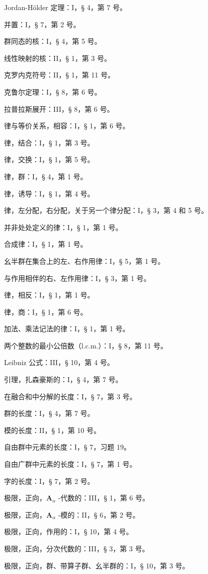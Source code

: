 Jordan-Hölder 定理：I，§ 4，第 7 号。

并置：I，§ 7，第 2 号。

群同态的核：I，§ 4，第 5 号。

线性映射的核：II，§ 1，第 3 号。

克罗内克符号：II，§ 1，第 11 号。

克鲁尔定理：I，§ 8，第 6 号。

拉普拉斯展开：III，§ 8，第 6 号。

律与等价关系，相容：I，§ 1，第 6 号。

律，结合：I，§ 1，第 3 号。

律，交换：I，§ 1，第 5 号。

律，群：I，§ 4，第 1 号。

律，诱导：I，§ 1，第 4 号。

律，左分配，右分配，关于另一个律分配：I，§ 3，第 4 和 5 号。

并非处处定义的律：I，§ 1，第 1 号。

合成律：I，§ 1，第 1 号。

幺半群在集合上的左、右作用律：I，§ 5，第 1 号。

与作用相伴的右、左作用律：I，§ 3，第 1 号。

律，相反：I，§ 1，第 1 号。

律，商：I，§ 1，第 6 号。

加法、乘法记法的律：I，§ 1，第 1 号。

两个整数的最小公倍数（l.c.m.）：I，§ 8，第 11 号。

Leibniz 公式：III，§ 10，第 4 号。

引理，扎森豪斯的：I，§ 4，第 7 号。

在融合和中分解的长度：I，§ 7，第 3 号。

群的长度：I，§ 4，第 7 号。

模的长度：II，§ 1，第 10 号。

自由群中元素的长度：I，§ 7，习题 19。

自由广群中元素的长度：I，§ 7，第 1 号。

字的长度：I，§ 7，第 2 号。

极限，正向，\(\mathbf{A}_{\alpha}\) -代数的：III，§ 1，第 6 号。

极限，正向，\(\mathbf{A}_{\alpha}\) -模的：II，§ 6，第 2 号。

极限，正向，作用的：I，§ 10，第 4 号。

极限，正向，分次代数的：III，§ 3，第 3 号。

极限，正向，群、带算子群、幺半群的：I，§ 10，第 3 号。

